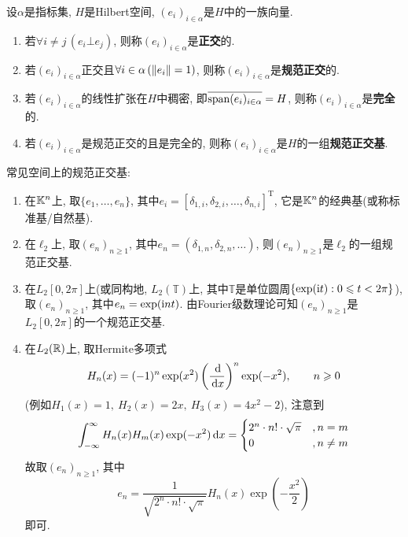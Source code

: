     \begin{Definition}[规范正交基]
    设$ \alpha $是指标集, $ H $是Hilbert空间, $ (e_i)_{i\in\alpha} $是$ H $中的一族向量.
    \begin{enumerate}[(1)]
    \item 若$ \forall i\ne j\,(e_i\bot e_j) $, 则称$ (e_i)_{i\in\alpha} $是\textbf{正交}的.
    \item 若$ (e_i)_{i\in\alpha} $正交且$ \forall i\in\alpha\,(\left\| e_i \right\|=1) $, 则称$ (e_i)_{i\in\alpha} $是\textbf{规范正交}的.
    \item 若$ (e_i)_{i\in\alpha} $的线性扩张在$ H $中稠密, 即$ \overline{\operatorname{span} (e_i)_{i\in\alpha}}=H $, 则称$ (e_i)_{i\in\alpha} $是\textbf{完全}的.
    \item 若$ (e_i)_{i\in\alpha} $是规范正交的且是完全的, 则称$ (e_i)_{i\in\alpha} $是$ H $的一组\textbf{规范正交基}.
    \end{enumerate}
    \end{Definition}

    \begin{Example}
    常见空间上的规范正交基:
    \begin{enumerate}[(1)]
    \item 在$ \mathbb{K}^n $上, 取$ \{ e_1, \dots,e_n \} $, 其中$ e_i=[\delta_{1,i},\delta_{2,i}, \dots,\delta_{n,i}]^\mathrm T $, 它是$ \mathbb{K}^n $的经典基(或称标准基/自然基).
    \item 在$ \ell_2 $上, 取$ (e_n)_{n\geqslant 1} $, 其中$ e_n=(\delta_{1,n},\delta_{2,n}, \dots) $, 则$ (e_n)_{n\geqslant 1} $是$ \ell_2 $的一组规范正交基.
    \item 在$ L_2[0,2\pi] $上(或同构地, $ L_2(\mathbb{T}) $上, 其中$ \mathbb{T} $是单位圆周$ \{ \exp(\mathrm{i} t) : 0\leqslant t<2\pi \} $), 取$ (e_n)_{n\geqslant 1} $, 其中$ e_n=\exp(\mathrm{i} nt) $. 由Fourier级数理论可知$ (e_n)_{n\geqslant 1} $是$ L_2[0,2\pi] $的一个规范正交基.
    \item 在$ L_2(\mathbb{R}) $上, 取Hermite多项式
    \[
    H_n(x)=(-1)^n\exp(x^2)\left(\frac{\,\mathrm{d}}{\,\mathrm{d} x}\right)^n\exp(-x^2),\qquad n\geqslant 0
    \]
    (例如$ H_1(x)=1,\ H_2(x)=2x,\ H_3(x)=4x^2-2 $), 注意到
    \[
    \int_{-\infty}^{\infty}H_n(x)H_m(x)\exp(-x^2)\,\mathrm{d} x=\begin{cases}
    2^n\cdot n!\cdot\sqrt{\pi} & ,n=m\\ 0 & ,n\ne m
    \end{cases}
    \]
    故取$ (e_n)_{n\geqslant 1} $, 其中
    \[
    e_n=\frac{1}{\sqrt{2^n\cdot n!\cdot\sqrt{\pi}}}H_n(x)\exp\left(-\frac{x^2}{2}\right)
    \]
    即可.
    \end{enumerate}
    \end{Example}

